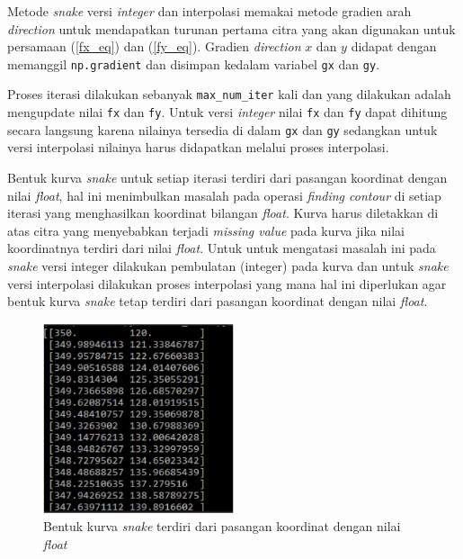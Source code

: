 Metode \emph{snake} versi \emph{integer} dan interpolasi memakai metode gradien arah \emph{direction} untuk mendapatkan turunan pertama citra yang akan digunakan untuk persamaan (\ref{fx_eq}) dan (\ref{fy_eq}). Gradien \emph{direction} $x$ dan $y$ didapat dengan memanggil \texttt{np.gradient} dan disimpan kedalam variabel \texttt{gx} dan \texttt{gy}.

Proses iterasi dilakukan sebanyak \texttt{max\_num\_iter} kali dan yang dilakukan adalah mengupdate nilai \texttt{fx} dan \texttt{fy}. Untuk versi \emph{integer} nilai \texttt{fx} dan \texttt{fy} dapat dihitung secara langsung karena nilainya tersedia di dalam \texttt{gx} dan \texttt{gy} sedangkan untuk versi interpolasi nilainya harus didapatkan melalui proses interpolasi. 

Bentuk kurva \emph{snake} untuk setiap iterasi terdiri dari pasangan koordinat dengan nilai \emph{float}, hal ini menimbulkan masalah pada operasi \emph{finding contour} di setiap iterasi yang menghasilkan koordinat bilangan \emph{float}. Kurva harus diletakkan di atas citra yang menyebabkan terjadi \emph{missing value} pada kurva jika nilai koordinatnya terdiri dari nilai \emph{float}. Untuk untuk mengatasi masalah ini pada \emph{snake} versi integer dilakukan pembulatan (integer) pada kurva dan untuk \emph{snake} versi interpolasi dilakukan proses interpolasi yang mana hal ini diperlukan agar bentuk kurva \emph{snake} tetap terdiri dari pasangan koordinat dengan nilai \emph{float}.
\begin{figure}[H]
	\centering
	\includegraphics[width=0.5\textwidth]{gambar/curve_vector}
	\caption{Bentuk kurva \emph{snake} terdiri dari pasangan koordinat dengan nilai \emph{float} }
	\label{Gambar:snake_float}
\end{figure}


